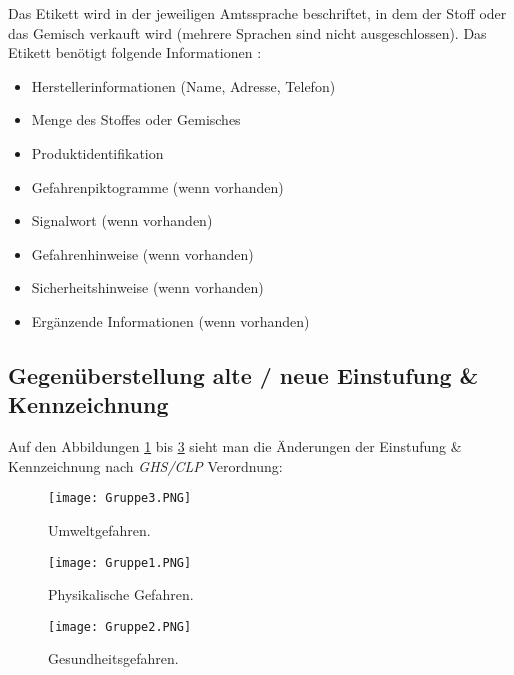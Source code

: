 Das Etikett wird in der jeweiligen Amtssprache beschriftet, in dem der Stoff oder 
das Gemisch verkauft wird (mehrere Sprachen sind nicht ausgeschlossen). Das 
Etikett benötigt folgende Informationen \cite{dguv}:
\begin{itemize}[itemsep=0pt]
    \item Herstellerinformationen (Name, Adresse, Telefon) 
    \item Menge des Stoffes oder Gemisches
    \item Produktidentifikation
    \item Gefahrenpiktogramme (wenn vorhanden)
    \item Signalwort (wenn vorhanden)
    \item Gefahrenhinweise (wenn vorhanden)
    \item Sicherheitshinweise (wenn vorhanden)
    \item Ergänzende Informationen (wenn vorhanden)
\end{itemize}

\subsection{Gegenüberstellung alte / neue Einstufung \& Kennzeichnung}

Auf den Abbildungen \ref{fig:umwgefahren} bis \ref{fig:gesgefahren} sieht man die 
Änderungen der Einstufung \& Kennzeichnung nach \emph{GHS/CLP} Verordnung: 

\begin{figure}[H]
    \centering
    \texttt{[image: Gruppe3.PNG]}
    \caption[Umweltgefahren]{\small{Umweltgefahren. \cite{bgw}}}
    \label{fig:umwgefahren}
\end{figure}

\begin{figure}[H]
    \centering
    \texttt{[image: Gruppe1.PNG]}
    \caption[Physikalische Gefahren]{\small{Physikalische Gefahren. \cite{bgw}}}
    \label{fig:phsgefahren}
\end{figure}

\begin{figure}[H]
    \centering
    \texttt{[image: Gruppe2.PNG]}
    \caption[Gesundheitsgefahren]{\small{Gesundheitsgefahren. \cite{bgw}}}
    \label{fig:gesgefahren}
\end{figure}
